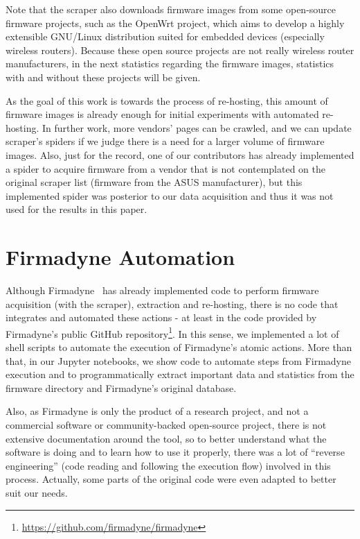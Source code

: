 Note that the scraper also downloads firmware images from some open-source firmware projects, such as the OpenWrt project, which aims to develop a highly extensible GNU/Linux distribution suited for embedded devices (especially wireless routers). Because these open source projects are not really wireless router manufacturers, in the next statistics regarding the firmware images, statistics with and without these projects will be given.

As the goal of this work is towards the process of re-hosting, this amount of firmware images is already enough for initial experiments with automated re-hosting. In further work, more vendors' pages can be crawled, and we can update scraper's spiders if we judge there is a need for a larger volume of firmware images. Also, just for the record, one of our contributors has already implemented a spider to acquire firmware from a vendor that is not contemplated on the original scraper list (firmware from the ASUS manufacturer), but this implemented spider was posterior to our data acquisition and thus it was not used for the results in this paper.

\section{Firmadyne Automation}

Although Firmadyne~\cite{firmadyne} has already implemented code to perform firmware acquisition (with the scraper), extraction and re-hosting, there is no code that integrates and automated these actions - at least in the code provided by Firmadyne's public GitHub repository\footnote{\url{https://github.com/firmadyne/firmadyne}}. In this sense, we implemented a lot of shell scripts to automate the execution of Firmadyne's atomic actions. More than that, in our Jupyter notebooks, we show code to automate steps from Firmadyne execution and to programmatically extract important data and statistics from the firmware directory and Firmadyne's original database.

Also, as Firmadyne is only the product of a research project, and not a commercial software or community-backed open-source project, there is not extensive documentation around the tool, so to better understand what the software is doing and to learn how to use it properly, there was a lot of ``reverse engineering'' (code reading and following the execution flow) involved in this process. Actually, some parts of the original code were even adapted to better suit our needs.

